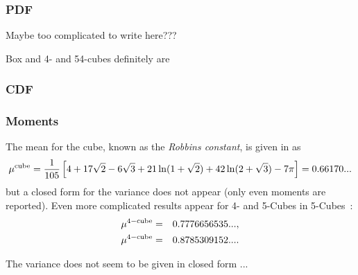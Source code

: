 \subsubsection{PDF}

Maybe too complicated to write here???

Box and 4- and 54-cubes definitely are


\subsubsection{CDF}


\subsubsection{Moments}

The mean for the cube, known as the {\em Robbins constant}, is given
in \cite{robbins78:_constant,weisstein:_cube_line_picking} as
\begin{equation}
   \label{eq:cube_mean}
 \mu^{\rm cube} = \frac{1}{105} \left[ 
                             4 + 17 \sqrt{2}- 6 \sqrt{3}  +
                             21 \ln(1+\sqrt{2}) + 
                             42 \ln(2+\sqrt{3}) - 7 \pi
                      \right]
	=	0.66170...
\end{equation}
but a closed form for the variance does not appear (only even moments
are reported). Even more complicated results appear for 4- and 5-Cubes in
5-Cubes~\cite{philip:_probab_distr_distan_between_two_4d}:
\begin{eqnarray}
 \mu^{\rm 4-cube} & = & 0.7776656535 ...    \label{eq:4-cube}, \\
 \mu^{\rm 4-cube} & = & 0.8785309152 ...     \label{eq:5-cube}.
\end{eqnarray}

The variance does not seem to be given in closed form ...

